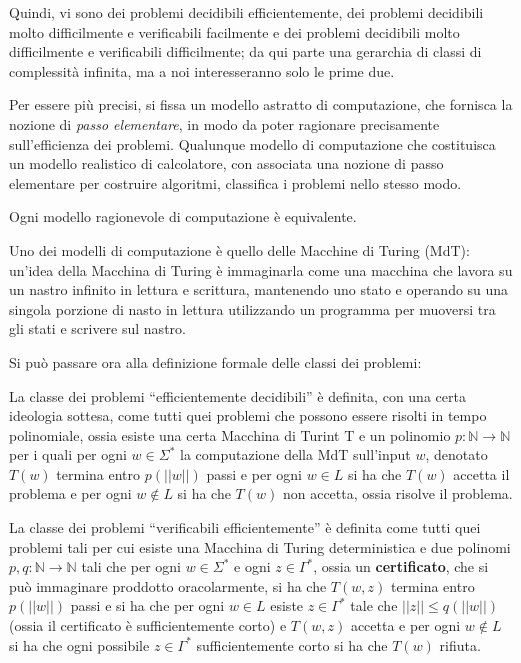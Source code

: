 Quindi, vi sono dei problemi decidibili efficientemente, 
dei problemi decidibili molto difficilmente e verificabili facilmente 
e dei problemi decidibili molto difficilmente e verificabili difficilmente; 
da qui parte una gerarchia di classi di complessità infinita, ma a noi interesseranno 
solo le prime due. 
 
Per essere più precisi, si fissa un modello astratto di computazione, che fornisca 
la nozione di \textit{passo elementare}, in modo da poter ragionare precisamente 
sull'efficienza dei problemi. 
Qualunque modello di computazione che costituisca un modello realistico 
di calcolatore, con associata una nozione di passo elementare per costruire 
algoritmi, classifica i problemi nello stesso modo. 

\begin{oss}
  Ogni modello ragionevole di computazione è equivalente.
\end{oss}

Uno dei modelli di computazione è quello delle Macchine di Turing (MdT): un'idea 
della Macchina di Turing è immaginarla come una macchina che lavora su un 
nastro infinito in lettura e scrittura, mantenendo uno stato e operando su 
una singola porzione di nasto in lettura utilizzando un programma per 
muoversi tra gli stati e scrivere sul nastro. 

Si può passare ora alla definizione formale delle classi dei problemi: 
\begin{defi}
  La classe dei problemi ``efficientemente decidibili'' è definita, con una 
  certa ideologia sottesa, come tutti quei problemi che possono essere 
  risolti in tempo polinomiale, ossia esiste una certa Macchina di Turint T 
  e un polinomio $p: \mathbb{N}\rightarrow \mathbb{N}$ per i quali per ogni 
  $w \in \Sigma^*$  la computazione della MdT sull'input $w$, 
  denotato $T(w)$ termina entro $p(||w||)$ passi e per ogni $w \in L$ si 
  ha che $T(w)$ accetta il problema e per ogni $w \notin L$  si ha 
  che $T(w)$ non accetta, ossia risolve il problema.
\end{defi}

\begin{defi}
  La classe dei problemi ``verificabili efficientemente'' è definita come 
  tutti quei problemi tali per cui esiste una Macchina di Turing deterministica 
  e due polinomi $p,q:\mathbb{N}\rightarrow \mathbb{N}$ tali che per ogni 
  $w \in \Sigma^*$ e ogni $z \in \Gamma^*$, ossia un \textbf{certificato}, 
  che si può immaginare proddotto oracolarmente, si ha 
  che $T(w,z)$ termina entro $p(||w||)$ passi e si ha che per ogni 
  $w \in L$ esiste $z \in \Gamma^*$ tale che $||z|| \leq q(||w||)$ (ossia 
  il certificato è sufficientemente corto) e $T(w,z)$ accetta e per ogni 
  $w \notin L$ si ha che ogni possibile $z \in \Gamma^*$ sufficientemente corto
  si ha che $T(w)$ rifiuta.
\end{defi}

